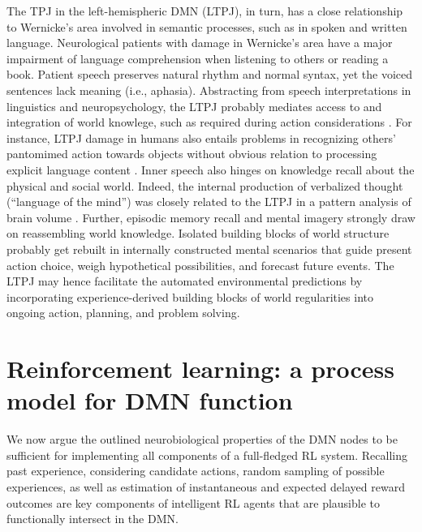 \documentclass[10pt,letterpaper]{article}
\begin{document}
The TPJ in the left-hemispheric DMN (LTPJ),
in turn, has a close relationship to Wernicke's area
involved in semantic processes, such as in spoken and written language.
Neurological patients with damage in Wernicke's area
have a major impairment of language comprehension
when listening to others or reading a book.
Patient speech
preserves natural rhythm and normal syntax, yet the
voiced sentences lack meaning (i.e., aphasia).
Abstracting from speech interpretations in linguistics
and neuropsychology,
the LTPJ probably mediates access to and integration of world knowlege,
such as required during action considerations
\citep{binder2011neurobiology, seghier2013angular}.
For instance, LTPJ damage in humans also entails problems in recognizing
others' pantomimed action towards objects
without obvious relation to processing explicit language content
\citep{varney1987locus}.
%
Inner speech also hinges on knowledge recall
about the physical and social world.
Indeed,
the internal production of
verbalized thought (``language of the mind'') was closely related to the LTPJ
in a pattern analysis of brain volume
\citep{geva2011neural}.
Further,
episodic memory recall and mental imagery strongly draw on
reassembling world knowledge.
Isolated building blocks of world structure probably get rebuilt
in internally constructed mental scenarios that
guide present action choice,
weigh hypothetical possibilities, and forecast future events.
%
The LTPJ may hence facilitate the automated environmental predictions
by incorporating experience-derived building blocks of world regularities
into ongoing action, planning, and problem solving.



\section{Reinforcement learning: a process model for DMN function}
We now argue the outlined neurobiological properties
of the DMN nodes
to be sufficient for implementing all components
of a full-fledged RL system.
Recalling past experience, considering candidate actions,
random sampling of possible experiences, as well as
estimation of instantaneous and expected delayed reward outcomes
are key components of intelligent RL agents
that are plausible to functionally intersect in the DMN.
\end{document}
